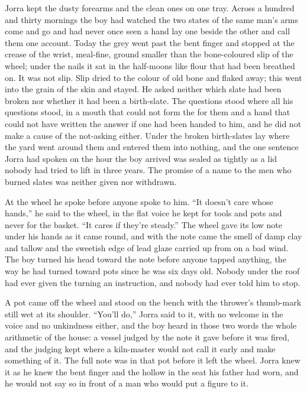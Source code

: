 Jorra kept the dusty forearms and the clean ones on one tray. Across a hundred and thirty mornings the boy had watched the two states of the same man's arms come and go and had never once seen a hand lay one beside the other and call them one account. Today the grey went past the bent finger and stopped at the crease of the wrist, meal-fine, ground smaller than the bone-coloured slip of the wheel; under the nails it sat in the half-moons like flour that had been breathed on. It was not slip. Slip dried to the colour of old bone and flaked away; this went into the grain of the skin and stayed. He asked neither which slate had been broken nor whether it had been a birth-slate. The questions stood where all his questions stood, in a mouth that could not form the  for them and a hand that could not have written the answer if one had been handed to him, and he did not make a cause of the not-asking either. Under  the broken birth-slates lay where the yard went around them and entered them into nothing, and the one sentence Jorra had spoken on the hour the boy arrived was sealed as tightly as a lid nobody had tried to lift in three years. The promise of a name to the men who burned slates was neither given nor withdrawn.

\scenebreak

At the wheel he spoke before anyone spoke to him. “It doesn't care whose hands,” he said to the wheel, in the flat voice he kept for tools and pots and never for the basket. “It cares if they're steady.” The wheel gave its low note under his hands as it came round, and with the note came the smell of damp clay and tallow and the sweetish edge of lead glaze carried up from  on a bad wind. The boy turned his head toward the note before anyone tapped anything, the way he had turned toward pots since he was six days old. Nobody under the roof had ever given the turning an instruction, and nobody had ever told him to stop.

A pot came off the wheel and stood on the bench with the thrower's thumb-mark still wet at its shoulder. “You'll do,” Jorra said to it, with no welcome in the voice and no unkindness either, and the boy heard in those two words the whole arithmetic of the house: a vessel judged by the note it gave before it was fired, and the judging kept where a kiln-master would not call it early and make something of it. The full note was in that pot before it left the wheel. Jorra knew it as he knew the bent finger and the hollow in the seat his father had worn, and he would not say so in front of a man who would put a figure to it.

